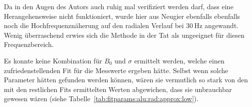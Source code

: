 {\begin{minipage}[t]{0.33\textwidth}
        \vspace{1em}
        \begin{minipage}[c][][b]{0.5\textwidth}
            \vspace{0pt}
            
        \end{minipage}%
        \begin{minipage}[c][][b]{0.5\textwidth}
            \resizebox{\textwidth}{!}{}
            \label{fig:alu:rad:low:sensor}
        \end{minipage}
	\end{minipage}%
	\begin{minipage}[t]{0.67\textwidth}
        \vspace{0mm}
        \hfill
        \resizebox{.95\textwidth}{!}{}
        \label{fig:alu:rad:exact:low}
	\end{minipage}

	\begin{minipage}[t]{0.33\textwidth}
        \vspace{0mm}
        Da in  den Augen des  Autors auch  ruhig mal verifiziert  werden darf,
        dass eine Herangehensweise nicht  funktioniert, wurde hier aus Neugier
        ebenfalls ebenfalls  noch die Hochfrequenzn\"aherung auf  den radialen
        Verlauf   bei  $\SI{30}{\hertz}$   angewandt.   Wenig   \"uberraschend
        erwies  sich  die Methode  in  der  Tat  als ungeeignet  f\"ur  diesen
        Frequenzbereich.

        Es  konnte  keine  Kombination  f\"ur  $B_0$  und  $\sigma$  ermittelt
        werden,  welche  einen  zufriedenstellenden Fit  f\"ur  die  Messwerte
        ergeben h\"atte. Selbst wenn solche Parameter h\"atten gefunden werden
        k\"onnen, w\"aren sie  vermutlich so stark von den  mit den restlichen
        Fits  ermittelten  Werten  abgewichen, dass  sie  unbrauchbar  gewesen
        w\"aren (siehe Tabelle~\ref{tab:fitparams:alu:rad:approx:low}).


\end{minipage}}
